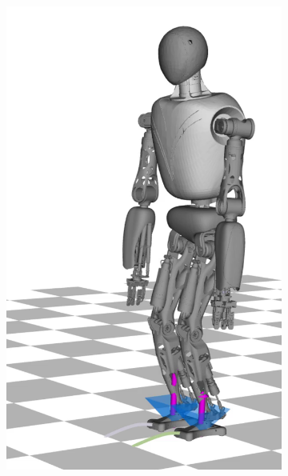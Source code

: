 \begin{figure}
\begin{subfigure}{.16\textwidth}
	\includegraphics[width=1\linewidth]{fig/walkDynamic/snaps/1}
	\caption{}
\end{subfigure}%
\begin{subfigure}{.16\textwidth}

\end{subfigure}
\end{figure}
